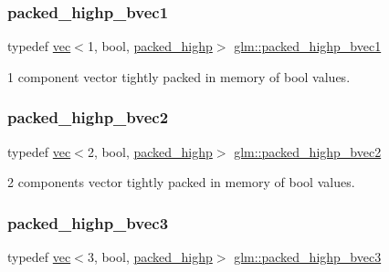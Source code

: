\subsubsection{\texorpdfstring{packed\+\_\+highp\+\_\+bvec1}{packed\_highp\_bvec1}}
{\footnotesize\ttfamily typedef \mbox{\hyperlink{structglm_1_1vec}{vec}}$<$1, bool, \mbox{\hyperlink{namespaceglm_a36ed105b07c7746804d7fdc7cc90ff25a8e8791ee77fe079b1291f710d88031bf}{packed\+\_\+highp}}$>$ \mbox{\hyperlink{group__gtc__type__aligned_ga00ef8acfca23dca78e1baa65bb5861ac}{glm\+::packed\+\_\+highp\+\_\+bvec1}}}



1 component vector tightly packed in memory of bool values. 

\mbox{\label{group__gtc__type__aligned_ga8059c50785881a9f30b9a8e3ff5daf83}} 
\subsubsection{\texorpdfstring{packed\+\_\+highp\+\_\+bvec2}{packed\_highp\_bvec2}}
{\footnotesize\ttfamily typedef \mbox{\hyperlink{structglm_1_1vec}{vec}}$<$2, bool, \mbox{\hyperlink{namespaceglm_a36ed105b07c7746804d7fdc7cc90ff25a8e8791ee77fe079b1291f710d88031bf}{packed\+\_\+highp}}$>$ \mbox{\hyperlink{group__gtc__type__aligned_ga8059c50785881a9f30b9a8e3ff5daf83}{glm\+::packed\+\_\+highp\+\_\+bvec2}}}



2 components vector tightly packed in memory of bool values. 

\mbox{\label{group__gtc__type__aligned_gafad47eaff82deab03a1e8d82d2dbd046}} 
\subsubsection{\texorpdfstring{packed\+\_\+highp\+\_\+bvec3}{packed\_highp\_bvec3}}
{\footnotesize\ttfamily typedef \mbox{\hyperlink{structglm_1_1vec}{vec}}$<$3, bool, \mbox{\hyperlink{namespaceglm_a36ed105b07c7746804d7fdc7cc90ff25a8e8791ee77fe079b1291f710d88031bf}{packed\+\_\+highp}}$>$ \mbox{\hyperlink{group__gtc__type__aligned_gafad47eaff82deab03a1e8d82d2dbd046}{glm\+::packed\+\_\+highp\+\_\+bvec3}}}



